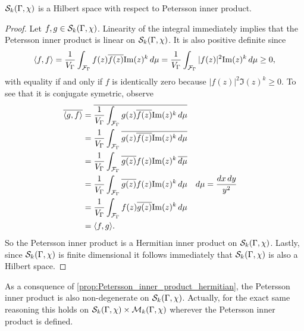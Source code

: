       \begin{proposition}\label{prop:Petersson_inner_product_hermitian}
        $\mathcal{S}_{k}(\Gamma,\chi)$ is a Hilbert space with respect to Petersson inner product.
      \end{proposition}
      \begin{proof}
        Let $f,g \in \mathcal{S}_{k}(\Gamma,\chi)$. Linearity of the integral immediately implies that the Petersson inner product is linear on $\mathcal{S}_{k}(\Gamma,\chi)$. It is also positive definite since
        \[
          \langle f,f\rangle = \frac{1}{V_{\Gamma}}\int_{\mathcal{F}_{\Gamma}}f(z)\overline{f(z)}\mathrm{Im}(z)^{k}\,d\mu = \frac{1}{V_{\Gamma}}\int_{\mathcal{F}_{\Gamma}}|f(z)|^{2}\mathrm{Im}(z)^{k}\,d\mu \ge 0,
        \]
        with equality if and only if $f$ is identically zero because $|f(z)|^{2}\Im(z)^{k} \ge 0$. To see that it is conjugate symetric, observe
        \begin{align*}
          \overline{\langle g,f\rangle} &= \overline{\frac{1}{V_{\Gamma}}\int_{\mathcal{F}_{\Gamma}}g(z)\overline{f(z)}\mathrm{Im}(z)^{k}\,d\mu} \\
          &= \frac{1}{V_{\Gamma}}\int_{\mathcal{F}_{\Gamma}}\overline{g(z)\overline{f(z)}\mathrm{Im}(z)^{k}\,d\mu} \\
          &= \frac{1}{V_{\Gamma}}\int_{\mathcal{F}_{\Gamma}}\overline{g(z)}f(z)\mathrm{Im}(z)^{k}\,\overline{d\mu} \\
          &= \frac{1}{V_{\Gamma}}\int_{\mathcal{F}_{\Gamma}}\overline{g(z)}f(z)\mathrm{Im}(z)^{k}\,d\mu && \text{$d\mu = \frac{dx\,dy}{y^{2}}$} \\
          &= \frac{1}{V_{\Gamma}}\int_{\mathcal{F}_{\Gamma}}f(z)\overline{g(z)}\mathrm{Im}(z)^{k}\,d\mu \\
          &= \langle f,g\rangle.
        \end{align*}
        So the Petersson inner product is a Hermitian inner product on $\mathcal{S}_{k}(\Gamma,\chi)$. Lastly, since $\mathcal{S}_{k}(\Gamma,\chi)$ is finite dimensional it follows immediately that $\mathcal{S}_{k}(\Gamma,\chi)$ is also a Hilbert space.
      \end{proof}

      \begin{remark}\label{rem:non-degeneracy_of_Petersson_inner_product}
        As a consquence of \cref{prop:Petersson_inner_product_hermitian}, the Petersson inner product is also non-degenerate on $\mathcal{S}_{k}(\Gamma,\chi)$. Actually, for the exact same reasoning this holds on $\mathcal{S}_{k}(\Gamma,\chi) \times \mathcal{M}_{k}(\Gamma,\chi)$ wherever the Petersson inner product is defined.
      \end{remark}

